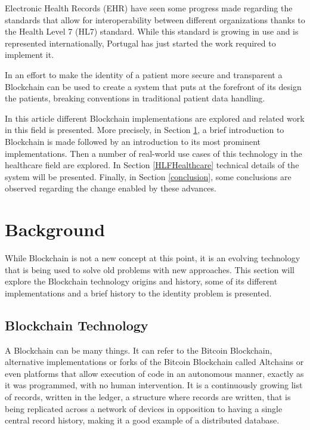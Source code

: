 \documentclass[]{llncs}
\begin{document}
Electronic Health Records (EHR) have seen some progress made regarding the
standards that allow for interoperability between different organizations
thanks to the Health Level 7 (HL7) standard.  While this standard is growing in
use and is represented internationally, Portugal has just started the work
required to implement it.  \cite{HealthLevel7}

In an effort to make the identity of a patient more secure and transparent a
Blockchain can be used to create a system that puts at the forefront of its
design the patients, breaking conventions in traditional patient data handling.

In this article different Blockchain implementations are explored and related
work in this field is presented.  More precisely, in Section \ref{background},
a brief introduction to Blockchain is made followed by an introduction to its
most prominent implementations. Then a number of real-world use cases of this
technology in the healthcare field are explored. In Section \ref{HLFHealthcare}
technical details of the system will be presented.  Finally, in Section
\ref{conclusion},  some conclusions are observed regarding the change enabled
by these advances.



\section{Background} \label{background}

While Blockchain is not a new concept at this point, it is an evolving
technology that is being used to solve old problems with new approaches. This
section will explore the Blockchain technology origins and history, some of its
different implementations and a brief history to the identity problem is
presented.

\subsection{Blockchain Technology}

A Blockchain can be many things. It can refer to the Bitcoin Blockchain,
alternative implementations or forks of the Bitcoin Blockchain called Altchains
or even platforms that allow execution of code in an autonomous manner, exactly
as it was programmed, with no human intervention.  It is a continuously growing
list of records, written in the ledger, a structure where records are written,
that is being replicated across a network of devices in opposition to having a
single central record history, making it a good example of a distributed
database.  \cite{Wood2017}
  
\end{document}

